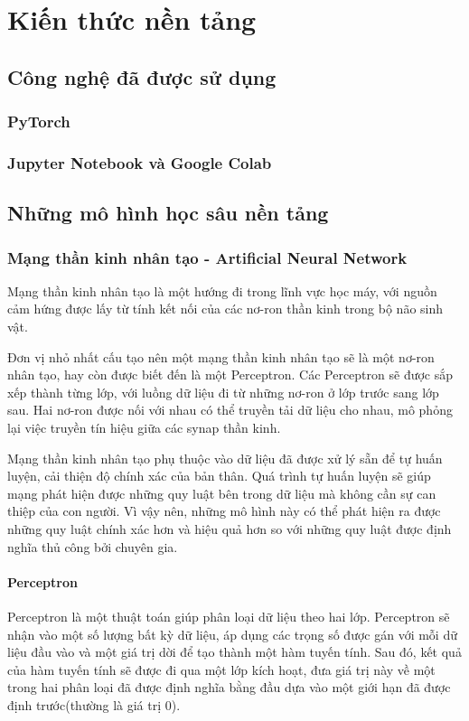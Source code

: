 \chapter{Kiến thức nền tảng}
\section{Công nghệ đã được sử dụng}
\subsection*{PyTorch}
\subsection*{Jupyter Notebook và Google Colab}
\section{Những mô hình học sâu nền tảng}
\subsection{Mạng thần kinh nhân tạo - Artificial Neural Network}
Mạng thần kinh nhân tạo là một hướng đi trong lĩnh vực học máy, với nguồn cảm hứng được lấy từ tính kết nối của các nơ-ron thần kinh trong bộ não sinh vật.

Đơn vị nhỏ nhất cấu tạo nên một mạng thần kinh nhân tạo sẽ là một nơ-ron nhân tạo, hay còn được biết đến là một Perceptron. Các Perceptron sẽ được sắp xếp thành từng lớp, với luồng dữ liệu đi từ những nơ-ron ở lớp trước sang lớp sau. Hai nơ-ron được nối với nhau có thể truyền tải dữ liệu cho nhau, mô phỏng lại việc truyền tín hiệu giữa các synap thần kinh.

Mạng thần kinh nhân tạo phụ thuộc vào dữ liệu đã được xử lý sẵn để tự huấn luyện, cải thiện độ chính xác của bản thân. Quá trình tự huấn luyện sẽ giúp mạng phát hiện được những quy luật bên trong dữ liệu mà không cần sự can thiệp của con người. Vì vậy nên, những mô hình này có thể phát hiện ra được những quy luật chính xác hơn và hiệu quả hơn so với những quy luật được định nghĩa thủ công bởi chuyên gia.
\subsubsection*{Perceptron}
Perceptron là một thuật toán giúp phân loại dữ liệu theo hai lớp. Perceptron sẽ nhận vào một số lượng bất kỳ dữ liệu, áp dụng các trọng số được gán với mỗi dữ liệu đầu vào và một giá trị dời để tạo thành một hàm tuyến tính. Sau đó, kết quả của hàm tuyến tính sẽ được đi qua một lớp kích hoạt, đưa giá trị này về một trong hai phân loại đã được định nghĩa bằng đầu dựa vào một giới hạn đã được định trước(thường là giá trị 0).

